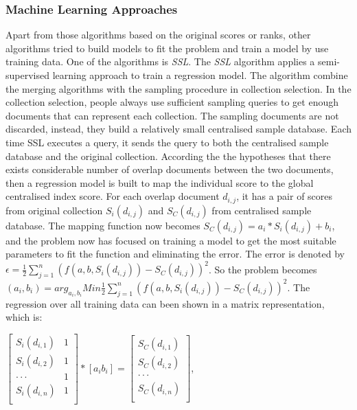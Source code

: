 \subsubsection{Machine Learning Approaches}
Apart from those algorithms based on the original scores or ranks, other algorithms tried to build models to fit the problem and train a model by use training data. One of the algorithms is  \textit{SSL}\cite{Si2002,Si2003a}. The \textit{SSL} algorithm applies a semi-supervised learning approach to train a regression model. The algorithm combine the merging algorithms with the sampling procedure in collection selection. In the collection selection, people always use sufficient sampling queries to get enough documents that can represent each collection. The sampling documents are not discarded, instead, they build a relatively small centralised sample database. Each time SSL executes a query, it sends the query to both the centralised sample database and the original collection. According the the hypotheses that there exists considerable number of overlap documents between the two documents, then a regression model is built to map the individual score to the global centralised index score. For each overlap document $d_{i,j}$, it has a pair of scores from original collection $S_i(d_{i,j})$ and $S_C(d_{i,j})$ from centralised sample database. The mapping function now becomes $S_C(d_{i,j})=a_i*S_i(d_{i,j})+b_i$, and the problem now has focused on training a model to get the most suitable parameters to fit the function and eliminating the error. The error is denoted by $\epsilon=\frac{1}{2}\sum\limits_{j=1}^n(f(a,b,S_i(d_{i,j}))-S_C(d_{i,j}))^2$. So the problem becomes $(a_i,b_i)=arg_{a_i,b_i} Min\frac{1}{2}\sum\limits_{j=1}^n(f(a,b,S_i(d_{i,j}))-S_C(d_{i,j}))^2$. The regression over all training data can been shown in a matrix representation, which is:

$
\begin{bmatrix}
       S_i(d_{i,1})& 1           \\[0.3em]
       S_i(d_{i,2})& 1           \\[0.3em]
       \cdotp\cdotp\cdotp   &1        \\[0.3em]
       S_i(d_{i,n})& 1           \\[0.3em]
     \end{bmatrix}
     *[a_i b_i]=
     \begin{bmatrix}
       S_C(d_{i,1})           \\[0.3em]
       S_C(d_{i,2})           \\[0.3em]
       \cdotp\cdotp\cdotp         \\[0.3em]
       S_C(d_{i,n})           \\[0.3em]
     \end{bmatrix}
$,

